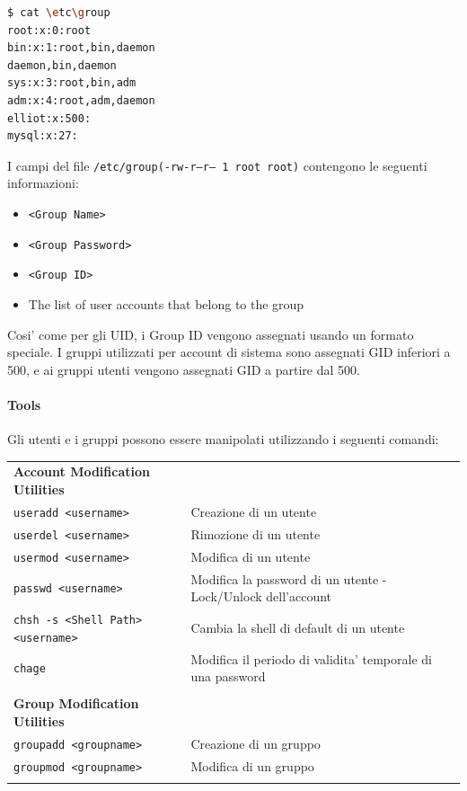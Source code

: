 \begin{lstlisting}[language=bash,basicstyle=\ttfamily,frame=single,caption={Struttura di un file /etc/group},captionpos=b]
$ cat \etc\group
root:x:0:root
bin:x:1:root,bin,daemon
daemon,bin,daemon
sys:x:3:root,bin,adm
adm:x:4:root,adm,daemon
elliot:x:500:
mysql:x:27:
\end{lstlisting}

I campi del file \texttt{/etc/group}\texttt{(-rw-r--r-- 1 root root)} contengono le seguenti informazioni:
\begin{itemize}
	\item \texttt{<Group Name>}
	\item \texttt{<Group Password>}
	\item \texttt{<Group ID>}
	\item The list of user accounts that belong to the group
\end{itemize}
Cosi' come per gli UID, i Group ID vengono assegnati usando un formato speciale. I gruppi utilizzati per account di sistema sono assegnati GID inferiori a 500, e ai gruppi utenti vengono assegnati GID a partire dal 500.

\paragraph{Tools}
Gli utenti e i gruppi possono essere manipolati utilizzando i seguenti comandi: 

\begin{center}
\begin{tabular}{ll}
	\textbf{Account Modification Utilities} & \\
	\texttt{useradd <username>} & Creazione di un utente\\ 
	\texttt{userdel <username>} & Rimozione di un utente\\ 
	\texttt{usermod <username>} & Modifica di un utente\\ 
	\texttt{passwd <username>} & Modifica la password di un utente - Lock/Unlock dell'account\\ 
	\texttt{chsh -s <Shell Path> <username>} & Cambia la shell di default di un utente\\ 
	\texttt{chage}  & Modifica il periodo di validita' temporale di una password \\ 
	\\
	\textbf{Group Modification Utilities} & \\
	\texttt{groupadd <groupname>} & Creazione di un gruppo \\
	\texttt{groupmod <groupname>} & Modifica di un gruppo \\ 
	\\
\end{tabular}
\end{center}

